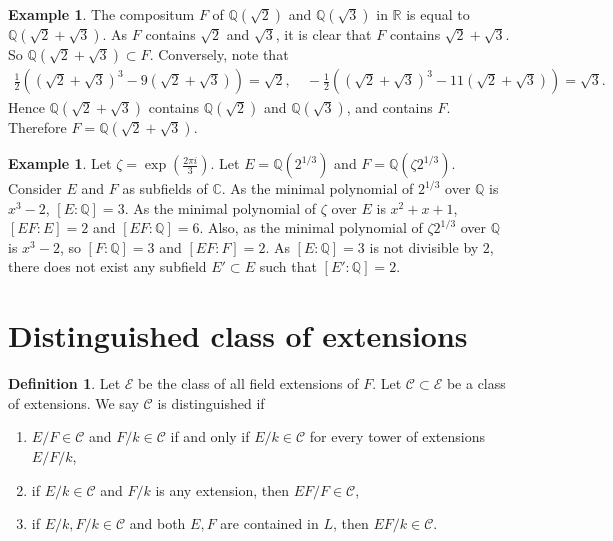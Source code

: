 \documentclass[12pt]{report}
\theoremstyle{plain}
\theoremstyle{remark}
\theoremstyle{definition}
\newtheorem{definition}[theorem]{Definition}
\newtheorem{example}[theorem]{Example}
\newcommand{\Q}{\mathbb{Q}}
\newcommand{\R}{\mathbb{R}}
\newcommand{\C}{\mathbb{C}}
\begin{document}
\begin{example}
    The compositum $F$ of $\Q(\sqrt{2})$ and $\Q(\sqrt{3})$ in $\R$ is equal to $\Q(\sqrt{2}+\sqrt{3})$. As $F$ contains $\sqrt{2}$ and $\sqrt{3}$, it is clear that $F$ contains $\sqrt{2}+\sqrt{3}$. So $\Q(\sqrt{2}+\sqrt{3})\subset F$. Conversely, note that
    \begin{align*}
        \frac{1}{2}\left((\sqrt{2}+\sqrt{3})^3 - 9(\sqrt{2}+\sqrt{3})\right) = \sqrt{2},\quad  -\frac{1}{2}\left((\sqrt{2}+\sqrt{3})^3 - 11(\sqrt{2}+\sqrt{3})\right) = \sqrt{3}.
    \end{align*}
    Hence $\Q(\sqrt{2}+\sqrt{3})$ contains $\Q(\sqrt{2})$ and $\Q(\sqrt{3})$, and contains $F$. Therefore $F=\Q(\sqrt{2}+\sqrt{3})$.
\end{example}

\begin{example}
    Let $\zeta=\exp \left(\frac{2\pi i}{3}\right)$. Let $E=\Q(2^{1/3})$ and $F = \Q(\zeta 2^{1/3})$. Consider $E$ and $F$ as subfields of $\C$. As the minimal polynomial of $2^{1/3}$ over $\Q$ is $x^3-2$, $[E:\Q]=3$. As the minimal polynomial of $\zeta$ over $E$ is $x^2+x+1$, $[EF:E]=2$ and $[EF:\Q]=6$. Also, as the minimal polynomial of $\zeta 2^{1/3}$ over $\Q$ is $x^3-2$, so $[F:\Q]=3$ and $[EF:F]=2$. As $[E:\Q]=3$ is not divisible by $2$, there does not exist any subfield $E'\subset E$ such that $[E':\Q]=2$.
\end{example}


\section{Distinguished class of extensions}
\begin{definition}
    Let $\mathcal{E}$ be the class of all field extensions of $F$. Let $\mathcal{C}\subset \mathcal{E}$ be a class of extensions. We say $\mathcal{C}$ is distinguished if
    \begin{enumerate}
        \item $E/F\in \mathcal{C}$ and $F/k\in\mathcal{C}$ if and only if $E/k\in\mathcal{C}$ for every tower of extensions $E/F/k$,
        \item if $E/k\in \mathcal{C}$ and $F/k$ is any extension, then $EF/F\in\mathcal{C}$,
        \item if $E/k, F/k\in\mathcal{C}$ and both $E,F$ are contained in $L$, then $EF/k\in\mathcal{C}$.
    \end{enumerate}
\end{definition}
\end{document}
